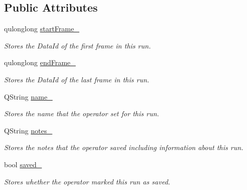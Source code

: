\subsection*{Public Attributes}
\begin{DoxyCompactItemize}
\item 
\hypertarget{class_picto_1_1_task_run_data_unit_a0ec6bd0bf2409e317caf57f32c6170b7}{qulonglong \hyperlink{class_picto_1_1_task_run_data_unit_a0ec6bd0bf2409e317caf57f32c6170b7}{start\-Frame\-\_\-}}\label{class_picto_1_1_task_run_data_unit_a0ec6bd0bf2409e317caf57f32c6170b7}

\begin{DoxyCompactList}\small\item\em Stores the Data\-Id of the first frame in this run. \end{DoxyCompactList}\item 
\hypertarget{class_picto_1_1_task_run_data_unit_aea69ff6964f95b273e0afda6a74599a5}{qulonglong \hyperlink{class_picto_1_1_task_run_data_unit_aea69ff6964f95b273e0afda6a74599a5}{end\-Frame\-\_\-}}\label{class_picto_1_1_task_run_data_unit_aea69ff6964f95b273e0afda6a74599a5}

\begin{DoxyCompactList}\small\item\em Stores the Data\-Id of the last frame in this run. \end{DoxyCompactList}\item 
\hypertarget{class_picto_1_1_task_run_data_unit_a58ec58edcff0a1b1f79e67ac7d6f35e7}{Q\-String \hyperlink{class_picto_1_1_task_run_data_unit_a58ec58edcff0a1b1f79e67ac7d6f35e7}{name\-\_\-}}\label{class_picto_1_1_task_run_data_unit_a58ec58edcff0a1b1f79e67ac7d6f35e7}

\begin{DoxyCompactList}\small\item\em Stores the name that the operator set for this run. \end{DoxyCompactList}\item 
\hypertarget{class_picto_1_1_task_run_data_unit_a095356b539e1f45c84423e727ea7bc88}{Q\-String \hyperlink{class_picto_1_1_task_run_data_unit_a095356b539e1f45c84423e727ea7bc88}{notes\-\_\-}}\label{class_picto_1_1_task_run_data_unit_a095356b539e1f45c84423e727ea7bc88}

\begin{DoxyCompactList}\small\item\em Stores the notes that the operator saved including information about this run. \end{DoxyCompactList}\item 
\hypertarget{class_picto_1_1_task_run_data_unit_ab7866019ebf15d8deea6e3037331f272}{bool \hyperlink{class_picto_1_1_task_run_data_unit_ab7866019ebf15d8deea6e3037331f272}{saved\-\_\-}}\label{class_picto_1_1_task_run_data_unit_ab7866019ebf15d8deea6e3037331f272}

\begin{DoxyCompactList}\small\item\em Stores whether the operator marked this run as saved. \end{DoxyCompactList}\end{DoxyCompactItemize}
